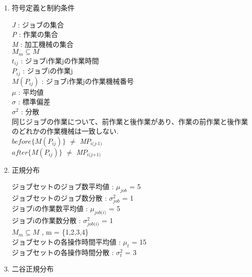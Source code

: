 \documentclass[twocolumn]{jarticle}
\begin{document}
    \begin{enumerate}
    \item \label{item:setting} 符号定義と制約条件
    
    \textit{J} : ジョブの集合\\
    \textit{P} : 作業の集合\\
    \textit{M} : 加工機械の集合\\
    $\textit{M}_{\textit{m}} \subseteq \textit{M}$\\
    $t_{\textit{ij}}$ : ジョブi作業jの作業時間\\
    $P_{\textit{ij}}$ : ジョブiの作業j\\
    $\textit{M}(P_{\textit{ij}})$ : ジョブi作業jの作業機械番号\\
    $\mu$ : 平均値\\
    $\sigma$ : 標準偏差\\
    $\sigma^2$ : 分散\\
    
    同じジョブの作業について、前作業と後作業があり、作業の前作業と後作業のどれかの作業機械は一致しない.\\

    $before\{\textit{M}(P_{\textit{ij}})\}$ $\neq$ \textit{M}$P_{\textit{i(j-1)}}$ \\
    $after\{\textit{M}(P_{\textit{ij}})\}$ $\neq$ \textit{M}$P_{\textit{i(j+1)}}$ \\

    \item 正規分布
    
    ジョブセットのジョブ数平均値 : $\mu_{\textit{job}}$ = 5\\
    ジョブセットのジョブ数分散 : $\sigma^2_{\textit{job}}$ = 1\\
    ジョブiの作業数平均値 : $\mu_\textit{job(i)}$ = 5\\
    ジョブiの作業数分散 : $\sigma^2_\textit{job(i)}$ = 1\\
    $\textit{M}_{\textit{m}} \subseteq \textit{M}$ , m = \{1,2,3,4\}\\
    ジョブセットの各操作時間平均値 : $\mu_{\textit{t}}$ = 15\\
    ジョブセットの各操作時間分散 : $\sigma^2_{\textit{t}}$ = 3\\

    \item 二谷正規分布
    

\end{enumerate}
\end{document}
